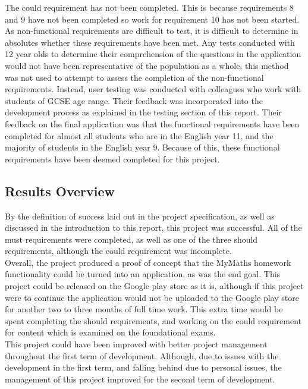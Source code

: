 \documentclass{article}
\begin{document}
The could requirement has not been completed. This is because requirements 8 and 9 have not been completed so work for requirement 10 has not been started. \\

As non-functional requirements are difficult to test, it is difficult to determine in absolutes whether these requirements have been met. Any tests conducted with 12 year olds to determine their comprehension of the questions in the application would not have been representative of the population as a whole, this method was not used to attempt to assess the completion of the non-functional requirements. Instead, user testing was conducted with colleagues who work with students of GCSE age range. Their feedback was incorporated into the development process as explained in the testing section of this report. Their feedback on the final application was that the functional requirements have been completed for almost all students who are in the English year 11, and the majority of students in the English year 9. Because of this, these functional requirements have been deemed completed for this project. \\

\subsection{Results Overview}

By the definition of success laid out in the project specification, as well as discussed in the introduction to this report, this project was successful. All of the must requirements were completed, as well as one of the three should requirements, although the could requirement was incomplete. \\

Overall, the project produced a proof of concept that the MyMaths homework functionality could be turned into an application, as was the end goal. This project could be released on the Google play store as it is, although if this project were to continue the application would not be uploaded to the Google play store for another two to three months of full time work. This extra time would be spent completing the should requirements, and working on the could requirement for content which is examined on the foundational exams. \\

This project could have been improved with better project management throughout the first term of development. Although, due to issues with the development in the first term, and falling behind due to personal issues, the management of this project improved for the second term of development. 
\end{document}
